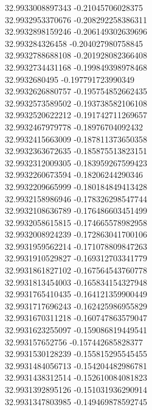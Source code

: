 {32.9933008897343	-0.21045706028375\\
32.9932953370676	-0.208292258386311\\
32.9932898159246	-0.206149302639696\\
32.993284326458	-0.204027980758845\\
32.9932788688108	-0.201928082366408\\
32.9932734431168	-0.199849398978468\\
32.9932680495	-0.197791723990349\\
32.9932626880757	-0.195754852662435\\
32.9932573589502	-0.193738582106108\\
32.9932520622212	-0.191742711269657\\
32.9932467979778	-0.18976704092432\\
32.9932415663009	-0.187811373650358\\
32.9932363672635	-0.185875513823151\\
32.9932312009305	-0.183959267599423\\
32.9932260673594	-0.18206244290346\\
32.9932209665999	-0.180184849413428\\
32.9932158986946	-0.178326298547744\\
32.9932108636789	-0.176486603451499\\
32.9932058615815	-0.174665578982958\\
32.9932008924239	-0.172863041700106\\
32.9931959562214	-0.171078809847263\\
32.9931910529827	-0.169312703341779\\
32.9931861827102	-0.167564543760778\\
32.9931813454003	-0.165834154327948\\
32.9931765410435	-0.164121359900449\\
32.9931717696243	-0.162425986955829\\
32.9931670311218	-0.160747863579047\\
32.9931623255097	-0.159086819449541\\
32.993157652756	-0.157442685828377\\
32.9931530128239	-0.155815295545455\\
32.9931484056713	-0.154204482986781\\
32.9931438312514	-0.152610084081823\\
32.9931392895126	-0.151031936290914\\
32.9931347803985	-0.149469878592745\\
}
